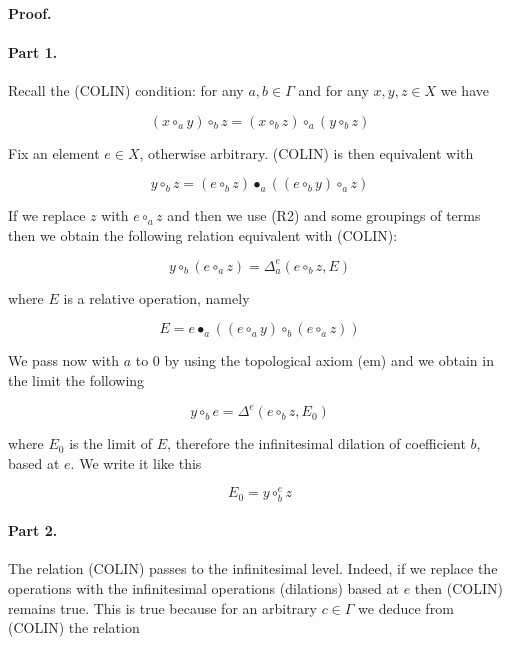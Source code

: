 \documentclass{article}
\begin{document}
\paragraph{Proof. }  \paragraph{Part 1.} Recall the (COLIN) condition: for any $a, b \in \Gamma$ and for any $x, y, z \in X$ we have 



$$ (x \circ_{a} y) \circ_{b} z = (x \circ_{b} z) \circ_{a} (y \circ_{b} z)$$



Fix an element $e \in X$, otherwise arbitrary. (COLIN) is then equivalent with 



$$ y \circ_{b} z = (e \circ_{b} z) \bullet_{a} ((e \circ_{b} y) \circ_{a} z)$$



If we replace $z$ with $e \circ_{a} z$ and then we use (R2) and some groupings of terms then we obtain the following relation equivalent with (COLIN):



$$ y \circ_{b} (e \circ_{a} z) = \Delta_{a}^{e}(e \circ_{b} z, E)$$



where $E$ is a relative operation, namely 



$$ E = e \bullet_{a} ((e \circ_{a} y) \circ_{b} (e \circ_{a} z))$$



We pass now with $a$ to $0$ by using the topological axiom (em) and we obtain in the limit the following 



$$ y \circ_{b} e = \Delta^{e}(e \circ_{b} z, E_{0})$$



where $E_{0}$ is the limit of $E$, therefore the infinitesimal dilation of coefficient $b$, based at $e$. We write it like this 



$$ E_{0} = y \circ_{b}^{e} z$$ 



\paragraph{Part 2.} The relation (COLIN) passes to the infinitesimal level. Indeed, if we replace the operations with the infinitesimal operations (dilations) based at $e$ then (COLIN) remains true.  This is true because  for an arbitrary $c \in \Gamma$ we deduce from (COLIN) the relation 
\end{document}
